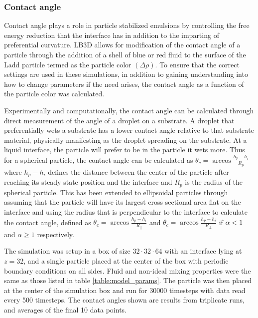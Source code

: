 \subsubsection{Contact angle}

Contact angle plays a role in particle stabilized emulsions by controlling the free energy reduction that the interface has in addition to the imparting of preferential curvature. LB3D allows for modification of the contact angle of a particle through the addition of a shell of blue or red fluid to the surface of the Ladd particle termed as the particle color $(\Delta \rho)$. \cite{jansen_bijels_2011, gunther_lattice_2013} To ensure that the correct settings are used in these simulations, in addition to gaining understanding into how to change parameters if the need arises, the contact angle as a function of the particle color was calculated.

Experimentally and computationally, the contact angle can be calculated through direct measurement of the angle of a droplet on a substrate. A droplet that preferentially wets a substrate has a lower contact angle relative to that substrate material, physically manifesting as the droplet spreading on the substrate. At a liquid interface, the particle will prefer to be in the particle it wets more. Thus for a spherical particle, the contact angle can be calculated as $\theta_c = \arccos{\frac{h_p - h_i}{R_p}}$ where $h_p - h_i$ defines the distance between the center of the particle after reaching its steady state position and the interface and $R_p$ is the radius of the spherical particle. \cite{gunther_lattice_2013, davies_interface_2014} This has been extended to ellipsoidal particles through assuming that the particle will have its largest cross sectional area flat on the interface and using the radius that is perpendicular to the interface to calculate the contact angle, defined as $\theta_c = \arccos{\frac{h_p - h_i}{R_{\parallel}}}$ and $\theta_c = \arccos{\frac{h_p - h_i}{R_{\perp}}}$ if $\alpha < 1$ and $\alpha \geq 1$ respectively. 

The simulation was setup in a box of size $32\cdot32\cdot64$ with an interface lying at $z = 32$, and a single particle placed at the center of the box with periodic boundary conditions on all sides. Fluid and non-ideal mixing properties were the same as those listed in table \ref{table:model_params}. The particle was then placed at the center of the simulation box and run for $30000$ timesteps with data read every 500 timesteps. The contact angles shown are results from triplicate runs, and averages of the final 10 data points. 

